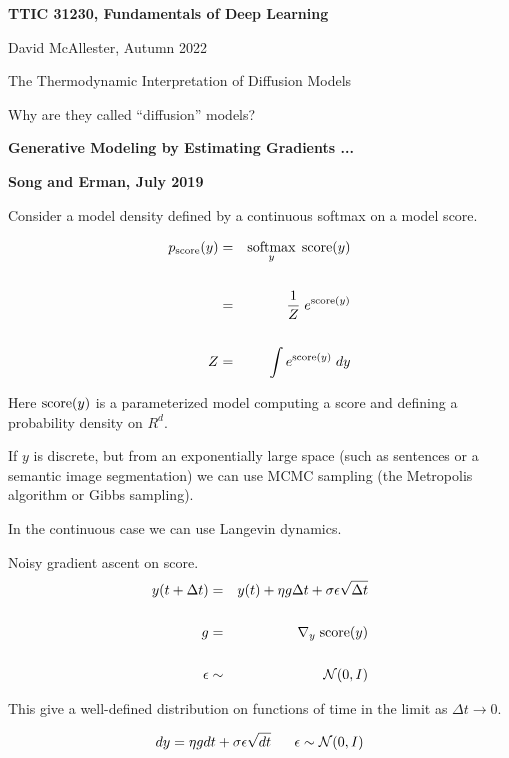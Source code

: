 





{\Huge

  \centerline{\bf TTIC 31230, Fundamentals of Deep Learning}
  \bigskip
  \centerline{David McAllester, Autumn 2022}
  \vfill
  \vfil
  \centerline{The Thermodynamic Interpretation of Diffusion Models}
  \vfill
  \centerline{Why are they called ``diffusion'' models?}
  \vfill
  \vfill
  \centerline{\bf Generative Modeling by Estimating Gradients ...}
\centerline{\bf Song and Erman, July 2019}

 

Consider a model density defined by a continuous softmax on a model score.

\vfill
\begin{eqnarray*}
  p_{\mathrm{score}}(y) & = & \operatorname*{softmax}_y\; \mathrm{score}(y) \\
  \\
  & = & \frac{1}{Z} \;e^{\mathrm{score}(y)} \\
  \\
  Z & = & \int e^{\mathrm{score}(y)}\;dy
\end{eqnarray*}

\vfill
Here $\mathrm{score}(y)$ is a parameterized model computing a score and defining a probability density on $R^d$.


If $y$ is discrete, but from an exponentially large space (such as sentences or a semantic image segmentation) we can use MCMC sampling
(the Metropolis algorithm or Gibbs sampling).

\vfill
In the continuous case we can use Langevin dynamics.


Noisy gradient ascent on score.
\begin{eqnarray*}
  y(t+ \Delta t) & = & y(t) + \eta g \Delta t +  \sigma \epsilon \sqrt{\Delta t} \\
\\
g & = & \nabla_y\;\mathrm{score}(y) \\
\\
\epsilon & \sim & {\cal N}(0,I)
\end{eqnarray*}

\vfill
This give a well-defined distribution on functions of time in the limit as $\Delta t \rightarrow 0$.

{\color{red} $$dy =  \eta g dt + \sigma \epsilon \sqrt{dt}\;\;\;\;\;\; \epsilon \sim {\cal N}(0,I)$$}

}
